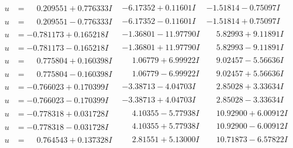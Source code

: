 \documentclass[1p]{elsarticle_modified}
\theoremstyle{definition}
\begin{document}
$$\begin{array}{c|c|c}
\begin{aligned}
u &= \phantom{-}0.209551 + 0.776333 I\end{aligned}
 & -6.17352 + 0.11601 I & -1.51814 - 0.75097 I \\ \hline\begin{aligned}
u &= \phantom{-}0.209551 - 0.776333 I\end{aligned}
 & -6.17352 - 0.11601 I & -1.51814 + 0.75097 I \\ \hline\begin{aligned}
u &= -0.781173 + 0.165218 I\end{aligned}
 & -1.36801 - 11.97790 I & \phantom{-}5.82993 + 9.11891 I \\ \hline\begin{aligned}
u &= -0.781173 - 0.165218 I\end{aligned}
 & -1.36801 + 11.97790 I & \phantom{-}5.82993 - 9.11891 I \\ \hline\begin{aligned}
u &= \phantom{-}0.775804 + 0.160398 I\end{aligned}
 & \phantom{-}1.06779 + 6.99922 I & \phantom{-}9.02457 - 5.56636 I \\ \hline\begin{aligned}
u &= \phantom{-}0.775804 - 0.160398 I\end{aligned}
 & \phantom{-}1.06779 - 6.99922 I & \phantom{-}9.02457 + 5.56636 I \\ \hline\begin{aligned}
u &= -0.766023 + 0.170399 I\end{aligned}
 & -3.38713 - 4.04703 I & \phantom{-}2.85028 + 3.33634 I \\ \hline\begin{aligned}
u &= -0.766023 - 0.170399 I\end{aligned}
 & -3.38713 + 4.04703 I & \phantom{-}2.85028 - 3.33634 I \\ \hline\begin{aligned}
u &= -0.778318 + 0.031728 I\end{aligned}
 & \phantom{-}4.10355 - 5.77938 I & \phantom{-}10.92900 + 6.00912 I \\ \hline\begin{aligned}
u &= -0.778318 - 0.031728 I\end{aligned}
 & \phantom{-}4.10355 + 5.77938 I & \phantom{-}10.92900 - 6.00912 I \\ \hline\begin{aligned}
u &= \phantom{-}0.764543 + 0.137328 I\end{aligned}
 & \phantom{-}2.81551 + 5.13000 I & \phantom{-}10.71873 - 6.57822 I \\ \hline\begin{aligned}

\end{aligned}
\end{array}$$
\end{document}
